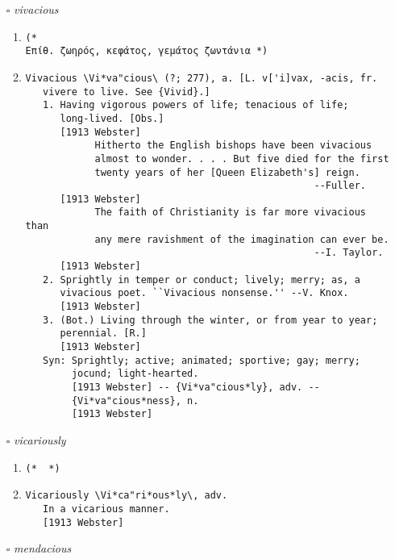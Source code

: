 \documentclass{article}
\begin{document}
\begin{itemize}
\begin{enumerate}
{\begin{lstlisting}
   [1913 Webster]
         There in deaf murmurs solemnly are wise. --Dryden.
   [1913 Webster]
         I do solemnly assure the reader.         --Swift.
   [1913 Webster]
\end{lstlisting}}
\end{enumerate}
\item[$\square$] \emph{ vivacious }
\begin{enumerate}
\item{
\begin{lstlisting}
(* 
Επίθ. ζωηρός, κεφάτος, γεμάτος ζωντάνια *)
\end{lstlisting}}
\item{
\begin{lstlisting}
Vivacious \Vi*va"cious\ (?; 277), a. [L. v['i]vax, -acis, fr.
   vivere to live. See {Vivid}.]
   1. Having vigorous powers of life; tenacious of life;
      long-lived. [Obs.]
      [1913 Webster]
            Hitherto the English bishops have been vivacious
            almost to wonder. . . . But five died for the first
            twenty years of her [Queen Elizabeth's] reign.
                                                  --Fuller.
      [1913 Webster]
            The faith of Christianity is far more vivacious than
            any mere ravishment of the imagination can ever be.
                                                  --I. Taylor.
      [1913 Webster]
   2. Sprightly in temper or conduct; lively; merry; as, a
      vivacious poet. ``Vivacious nonsense.'' --V. Knox.
      [1913 Webster]
   3. (Bot.) Living through the winter, or from year to year;
      perennial. [R.]
      [1913 Webster]
   Syn: Sprightly; active; animated; sportive; gay; merry;
        jocund; light-hearted.
        [1913 Webster] -- {Vi*va"cious*ly}, adv. --
        {Vi*va"cious*ness}, n.
        [1913 Webster]
\end{lstlisting}}
\end{enumerate}
\item[$\square$] \emph{ vicariously }
\begin{enumerate}
\item{
\begin{lstlisting}
(*  *)
\end{lstlisting}}
\item{
\begin{lstlisting}
Vicariously \Vi*ca"ri*ous*ly\, adv.
   In a vicarious manner.
   [1913 Webster]
\end{lstlisting}}
\end{enumerate}
\item[$\square$] \emph{ mendacious }

\end{itemize}
\end{document}
